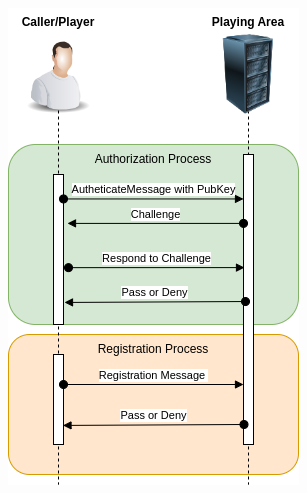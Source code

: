 \documentclass[11pt]{article}
\begin{document}
\begin{center}
\includegraphics{AuthenticateUML.png}
\end{center}
\end{document}
